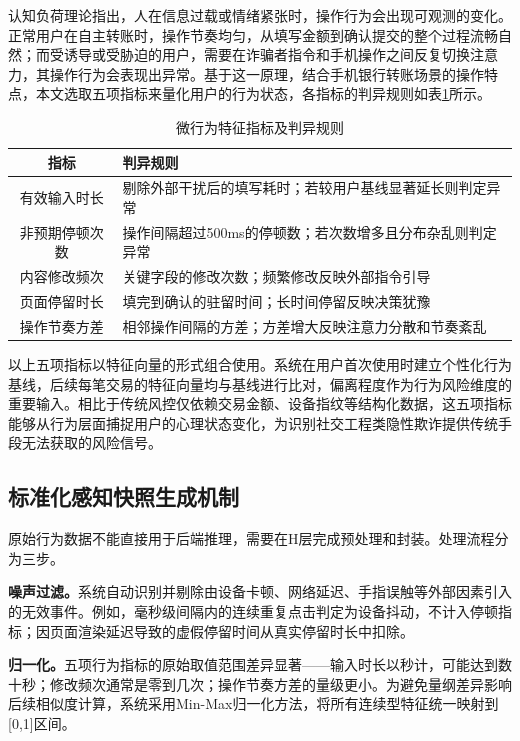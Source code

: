 \documentclass[twoside,openright]{xduugthesis}
\begin{document}
认知负荷理论指出，人在信息过载或情绪紧张时，操作行为会出现可观测的变化。正常用户在自主转账时，操作节奏均匀，从填写金额到确认提交的整个过程流畅自然；而受诱导或受胁迫的用户，需要在诈骗者指令和手机操作之间反复切换注意力，其操作行为会表现出异常。基于这一原理，结合手机银行转账场景的操作特点，本文选取五项指标来量化用户的行为状态，各指标的判异规则如表\ref{tab:micro-behavior}所示。

\begin{table}[H]
    \centering
    \caption{微行为特征指标及判异规则}
    \label{tab:micro-behavior}
    \begin{tabular}{|c|p{8cm}|}
        \hline
        指标 & 判异规则 \\
        \hline
        有效输入时长 & 剔除外部干扰后的填写耗时；若较用户基线显著延长则判定异常 \\
        \hline
        非预期停顿次数 & 操作间隔超过500ms的停顿数；若次数增多且分布杂乱则判定异常 \\
        \hline
        内容修改频次 & 关键字段的修改次数；频繁修改反映外部指令引导 \\
        \hline
        页面停留时长 & 填完到确认的驻留时间；长时间停留反映决策犹豫 \\
        \hline
        操作节奏方差 & 相邻操作间隔的方差；方差增大反映注意力分散和节奏紊乱 \\
        \hline
    \end{tabular}
\end{table}

以上五项指标以特征向量的形式组合使用。系统在用户首次使用时建立个性化行为基线，后续每笔交易的特征向量均与基线进行比对，偏离程度作为行为风险维度的重要输入。相比于传统风控仅依赖交易金额、设备指纹等结构化数据，这五项指标能够从行为层面捕捉用户的心理状态变化，为识别社交工程类隐性欺诈提供传统手段无法获取的风险信号。

\subsection{标准化感知快照生成机制}

原始行为数据不能直接用于后端推理，需要在H层完成预处理和封装。处理流程分为三步。

\textbf{噪声过滤。}系统自动识别并剔除由设备卡顿、网络延迟、手指误触等外部因素引入的无效事件。例如，毫秒级间隔内的连续重复点击判定为设备抖动，不计入停顿指标；因页面渲染延迟导致的虚假停留时间从真实停留时长中扣除。

\textbf{归一化。}五项行为指标的原始取值范围差异显著——输入时长以秒计，可能达到数十秒；修改频次通常是零到几次；操作节奏方差的量级更小。为避免量纲差异影响后续相似度计算，系统采用Min-Max归一化方法，将所有连续型特征统一映射到[0,1]区间。
\end{document}
